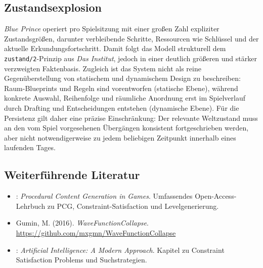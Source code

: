 \documentclass[parskip=half,a4paper,11pt]{scrreprt}
\begin{document}
\subsection*{Zustandsexplosion}

\textit{Blue Prince} operiert pro Spielsitzung mit einer großen Zahl expliziter Zustandsgrößen, darunter verbleibende Schritte, Ressourcen wie Schlüssel und der aktuelle Erkundungsfortschritt. Damit folgt das Modell strukturell dem \texttt{zustand/2}-Prinzip aus \textit{Das Institut}, jedoch in einer deutlich größeren und stärker verzweigten Faktenbasis. Zugleich ist das System nicht als reine Gegenüberstellung von statischem und dynamischem Design zu beschreiben: Raum-Blueprints und Regeln sind vorentworfen (statische Ebene), während konkrete Auswahl, Reihenfolge und räumliche Anordnung erst im Spielverlauf durch Drafting und Entscheidungen entstehen (dynamische Ebene). Für die Persistenz gilt daher eine präzise Einschränkung: Der relevante Weltzustand muss an den vom Spiel vorgesehenen Übergängen konsistent fortgeschrieben werden, aber nicht notwendigerweise zu jedem beliebigen Zeitpunkt innerhalb eines laufenden Tages.

\subsection*{Weiterführende Literatur}

\begin{itemize}
    \item \citet{Shaker2016}: \textit{Procedural Content Generation in Games}. Umfassendes Open-Access-Lehrbuch zu PCG, Constraint-Satisfaction und Levelgenerierung.
    \item Gumin, M. (2016). \textit{WaveFunctionCollapse}. \url{https://github.com/mxgmn/WaveFunctionCollapse}
    \item \citet{Russell2020}: \textit{Artificial Intelligence: A Modern Approach}. Kapitel zu Constraint Satisfaction Problems und Suchstrategien.
\end{itemize}
\end{document}
